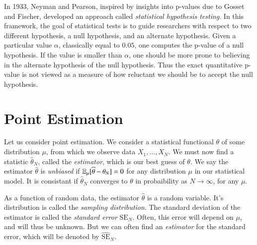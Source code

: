 In 1933, Neyman and Pearson, inspired by insights into p-values due to Gosset and Fischer, developed an approach called \emph{statistical hypothesis testing}. In this framework, the goal of statistical tests is to guide researchers with respect to two different hypothesis, a null hypothesis, and an alternate hypothesis. Given a particular value $\alpha$, classically equal to $0.05$, one computes the p-value of a null hypothesis. If the value is smaller than $\alpha$, one should be more prone to believing in the alternate hypothesis of the null hypothesis. Thus the exact quantitative p-value is not viewed as a measure of how reluctant we should be to accept the null hypothesis.









\chapter{Point Estimation}

Let us consider point estimation. We consider a statistical functional $\theta$ of some distribution $\mu$, from which we observe data $X_1,\dots,X_N$. We must now find a statistic $\widehat{\theta}_N$, called the \emph{estimator}, which is our best guess of $\theta$. We say the estimator $\widehat{\theta}$ is \emph{unbiased} if $\operatorname{\mathbb{E}}_\mu[\widehat{\theta} - \theta_N] = 0$ for any distribution $\mu$ in our statistical model. It is consistant if $\widehat{\theta}_N$ converges to $\theta$ in probaibility as $N \to \infty$, for any $\mu$.

As a function of random data, the estimator $\widehat{\theta}$ is a random variable. It's distribution is called the \emph{sampling distribution}. The standard deviation of the estimator is called the \emph{standard error} $\text{SE}_N$. Often, this error will depend on $\mu$, and will thus be unknown. But we can often find an \emph{estimator} for the standard error, which will be denoted by $\widehat{\text{SE}}_N$.

